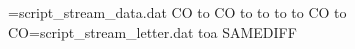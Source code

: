 \relax{}=script_stream_data.dat\relax{} C\else O\fi{} to\first[\first] C\else O\fi{} to\second[\second] to\third[\third]\relax{} to\fourth[\fourth]\relax{} to\fifth[\fifth] C\else O\fi{} to\sixth[\sixth] C\else O\fi{}=script_stream_letter.dat\relax{} to\ifcat{} a SAME\else DIFF\fi